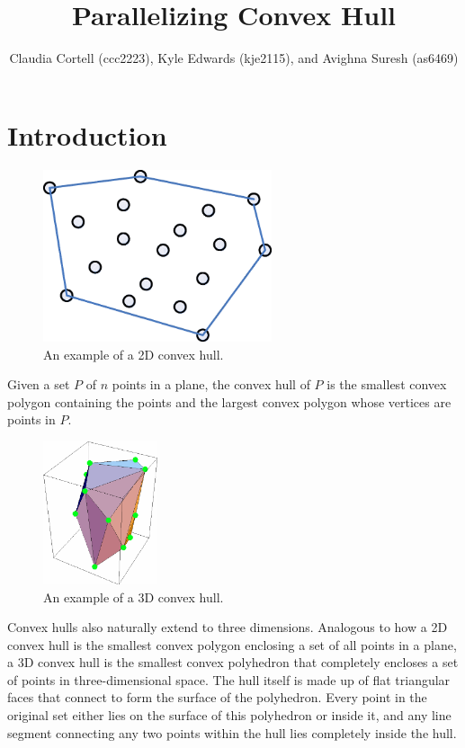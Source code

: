 \documentclass[12pt]{article}
\title{Parallelizing Convex Hull}
\author{Claudia Cortell (ccc2223), Kyle Edwards (kje2115), and Avighna Suresh (as6469)}
\begin{document}
  \maketitle
  \newpage

  \setcounter{section}{0}

  \section{Introduction}

    \begin{figure}[h]
      \centering
      \includegraphics[width=0.6\textwidth]{convex_hull.png}
      \caption{An example of a 2D convex hull.}
    \end{figure}

    \noindent
    Given a set $P$ of $n$ points in a plane, the convex hull of $P$ is the smallest convex polygon containing the points and the largest convex polygon whose vertices are points in $P$.

    \begin{figure}[h]
      \centering
      \includegraphics[width=0.3\textwidth]{convex_hull_3d.png}
      \caption{An example of a 3D convex hull.}
    \end{figure}

    Convex hulls also naturally extend to three dimensions. Analogous to how a 2D convex hull is the smallest convex polygon enclosing a set of all points in a plane, a 3D convex hull is the smallest convex polyhedron that completely encloses a set of points in three-dimensional space. The hull itself is made up of flat triangular faces that connect to form the surface of the polyhedron. Every point in the original set either lies on the surface of this polyhedron or inside it, and any line segment connecting any two points within the hull lies completely inside the hull.
\end{document}

